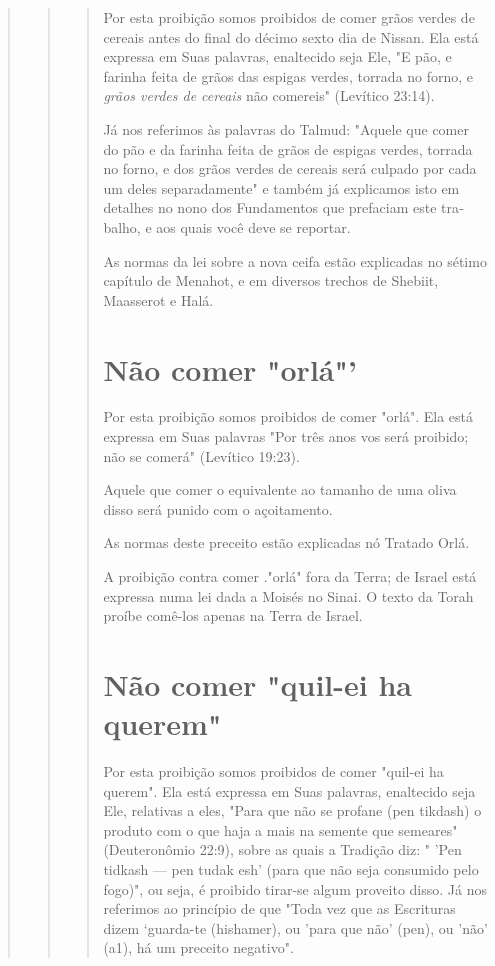 \begin{quote}
\begin{quote}
\begin{quote}
Por esta proibição somos proibidos de comer grãos verdes de ce­reais
antes do final do décimo sexto dia de Nissan. Ela está expressa em Suas
palavras, enaltecido seja Ele, "E pão, e farinha feita de grãos das
espigas verdes, torrada no forno, e \emph{grãos verdes de cereais} não
comereis" (Levítico 23:14).

Já nos referimos às palavras do Talmud: "Aquele que comer do pão e da
farinha feita de grãos de espigas verdes, torrada no forno, e dos grãos
ver­des de cereais será culpado por cada um deles separadamente" e
também já explicamos isto em detalhes no nono dos Fundamentos que
prefaciam este tra­balho, e aos quais você deve se reportar.

As normas da lei sobre a nova ceifa estão explicadas no sétimo capí­tulo
de Menahot, e em diversos trechos de Shebiit, Maasserot e Halá.

\section{Não comer "orlá"'}

Por esta proibição somos proibidos de comer "orlá". Ela está ex­pressa
em Suas palavras "Por três anos vos será proibido; não se comerá"
(Le­vítico 19:23).

Aquele que comer o equivalente ao tamanho de uma oliva disso será punido
com o açoitamento.

As normas deste preceito estão explicadas nó Tratado Orlá.

A proibição contra comer ."orlá" fora da Terra; de Israel está expres­sa
numa lei dada a Moisés no Sinai. O texto da Torah proíbe comê-los apenas
na Terra de Israel.


\section{Não comer "quil-ei ha querem"}

Por esta proibição somos proibidos de comer "quil-ei ha querem". Ela
está expressa em Suas palavras, enaltecido seja Ele, relativas a eles,
"Para que não se profane (pen tikdash) o produto com o que haja a mais
na semente que semeares" (Deuteronômio 22:9), sobre as quais a Tradição
diz: " 'Pen tid­kash --- pen tudak esh' (para que não seja consumido
pelo fogo)", ou seja, é proibido tirar-se algum proveito disso. Já nos
referimos ao princípio de que "To­da vez que as Escrituras dizem
`guarda-te (hishamer), ou 'para que não' (pen), ou 'não' (a1), há um
preceito negativo".


\end{quote}
\end{quote}
\end{quote}
